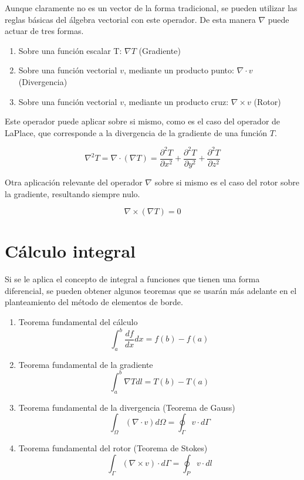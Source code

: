 \documentclass[12pt,letterpaper]{article}
\numberwithin{equation}{section}
\begin{document}
\noindent Aunque claramente no es un vector de la forma tradicional, se pueden utilizar las reglas básicas del álgebra vectorial con este operador. De esta manera $\nabla$ puede actuar de tres formas.

\begin{enumerate}
	\item Sobre una función escalar T: $\nabla T$ (Gradiente)
	\item Sobre una función vectorial $v$, mediante un producto punto: $\nabla\cdot v$ (Divergencia)
	\item Sobre una función vectorial $v$, mediante un producto cruz: $\nabla\times v$ (Rotor)
\end{enumerate}

\noindent Este operador puede aplicar sobre si mismo, como es el caso del operador de LaPlace, que corresponde a la divergencia de la gradiente de una función $T$.

$$\nabla^2 T=\nabla\cdot (\nabla T)=\frac{\partial^2 T}{\partial x^2}+\frac{\partial^2 T}{\partial y^2}+\frac{\partial^2 T}{\partial z^2}$$

\noindent Otra aplicación relevante del operador $\nabla$ sobre si mismo es el caso del rotor sobre la gradiente, resultando siempre nulo.

$$\nabla\times(\nabla T)=0$$

\pagebreak
\section*{Cálculo integral}
Si se le aplica el concepto de integral a funciones que tienen una forma diferencial, se pueden obtener algunos teoremas que se usarán más adelante en el planteamiento del método de elementos de borde.

\begin{enumerate}
	\item Teorema fundamental del cálculo
	$$\int_{a}^{b}\frac{df}{dx}dx=f(b)-f(a)$$
	\item Teorema fundamental de la gradiente
	$$\int_{a}^{b}\nabla Tdl=T(b)-T(a)$$
	\item Teorema fundamental de la divergencia (Teorema de Gauss)
	$$\int_{\Omega}(\nabla\cdot v)d\varOmega=\oint_{\Gamma}v\cdot d\varGamma$$
	\item Teorema fundamental del rotor (Teorema de Stokes)
	$$\int_{\Gamma}(\nabla\times v)\cdot d\varGamma=\oint_{P}v\cdot dl$$ 
\end{enumerate}
\end{document}
